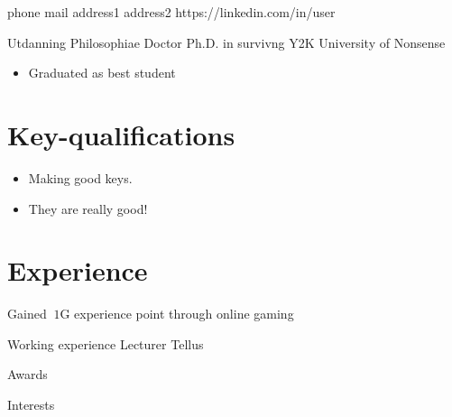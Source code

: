 \documentclass{nicecv}
\begin{document}
\begin{topinfo}%
           {phone}
           {mail}
           {address1}
           {address2}
            {https://linkedin.com/in/user}
\end{topinfo}

\begin{minipage}{0.5\textwidth}
    \begin{education}{Utdanning}
              {Philosophiae Doctor}
              {Ph.D. in survivng Y2K}
              {University of Nonsense}
              {
                \begin{itemize}[noitemsep,nolistsep,leftmargin=0in]
                    \item Graduated as best student
                \end{itemize}
              }
    \end{education}
\end{minipage}
\hfill
\begin{minipage}{0.425\textwidth}

    \section{Key-qualifications}
    \begin{itemize}[noitemsep,nolistsep]
        \item Making good keys.
        \item They are really good!
    \end{itemize}

    \vspace{0.4in}

    \section{Experience}
    Gained $~1$G experience point through online gaming

    \vspace{0.4in}

    \begin{work}{Working experience}
              {Lecturer}
              {Tellus}
    \end{work}
\end{minipage}

\begin{awards}{Awards}
\end{awards}

\vspace{0.2in}

\begin{others}{Interests}
\end{others}
\end{document}
